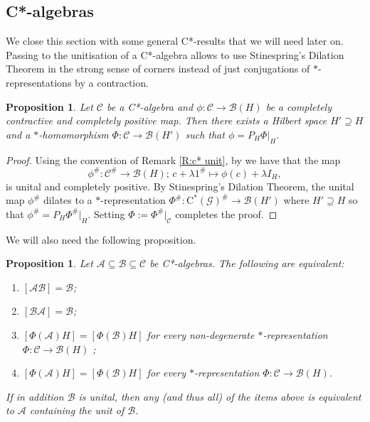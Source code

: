 \documentclass[11pt, draft]{amsart}
\numberwithin{equation}{section}
\theoremstyle{plain}
\newtheorem{proposition}[theorem]{Proposition}
\theoremstyle{definition}
\theoremstyle{remark}
\newcommand{\A}{{\mathcal{A}}}
\newcommand{\B}{{\mathcal{B}}}
\newcommand{\C}{{\mathcal{C}}}
\newcommand{\G}{{\mathcal{G}}}
\def\la{\lambda}
\newcommand{\ca}{\mathrm{C}^*}
\begin{document}
\subsection{C*-algebras}

We close this section with some general C*-results that we will need later on.
Passing to the unitisation of a C*-algebra allows to use Stinespring's Dilation Theorem in the strong sense of corners instead of just conjugations of $*$-representations by a contraction.

\begin{proposition}\label{P:Dil}
Let $\C$ be a C*-algebra and $\phi \colon \C \to \B(H)$ be a completely contractive and completely positive map.
Then there exists a Hilbert space $H' \supseteq H$ and a $*$-homomorphism $\Phi \colon \C \to \B(H')$ such that $\phi = P_H \Phi |_H$.
\end{proposition}

\begin{proof}
Using the convention of Remark \ref{R:c* unit}, by \cite[Corollary 4.17 and Proposition 4.9 (c)]{Wer02} we have that the map
\[
\phi^{\#}\colon \C^{\#} \to \B(H)\text{; } c + \la 1^{\#}  \mapsto \phi(c) + \la I_H,
\]
is unital and completely positive.
By Stinespring's Dilation Theorem, the unital map $\phi^{\#}$ dilates to a $*$-representation $\Phi^{\#}\colon \ca(\G)^\#\to \B(H')$ where $H'\supseteq H$ so that $\phi^{\#} = P_H \Phi^{\#} |_{H}$. 
Setting $\Phi := \Phi^{\#}|_{\C}$ completes the proof.
\end{proof}

We will also need the following proposition.

\begin{proposition}\label{P:multiplier}
Let $\A \subseteq \B \subseteq \C$ be C*-algebras.
The following are equivalent:
\begin{enumerate}
\item $[\A \B] = \B$;
\item $[\B \A] = \B$;
\item $[\Phi(\A) H] = [\Phi(\B) H]$ for every non-degenerate $*$-representation $\Phi \colon \C \to \B(H)$ ;
\item $[\Phi(\A) H] = [\Phi(\B) H]$ for every $*$-representation $\Phi \colon \C \to \B(H)$.
\end{enumerate}

If in addition $\B$ is unital, then any (and thus all) of the items above is equivalent to $\A$ containing the unit of $\B$.
\end{proposition}
\end{document}
